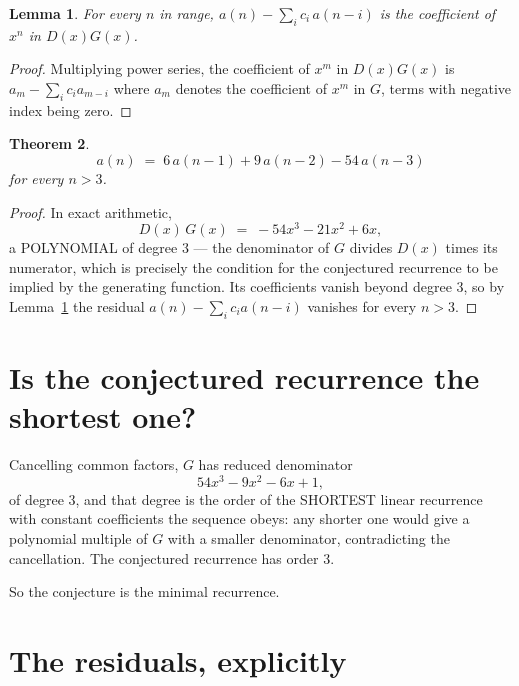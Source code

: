 \documentclass[11pt,a4paper]{article}
\theoremstyle{plain}
\newtheorem{theorem}{Theorem}
\newtheorem{lemma}[theorem]{Lemma}
\theoremstyle{definition}
\begin{document}
\begin{lemma}\label{lem:key}
For every $n$ in range, $a(n)-\sum_i c_i\,a(n-i)$ is the coefficient of $x^{n}$ in
$D(x)G(x)$.
\end{lemma}

\begin{proof}
Multiplying power series, the coefficient of $x^{m}$ in $D(x)G(x)$ is
$a_m-\sum_i c_i a_{m-i}$ where $a_m$ denotes the coefficient of $x^{m}$ in $G$, terms with
negative index being zero.
\end{proof}

\begin{theorem}
\[
a(n)\;=\;6\,a(n-1) + 9\,a(n-2) - 54\,a(n-3)
\]
for every $n>3$.
\end{theorem}

\begin{proof}
In exact arithmetic,
\[
D(x)\,G(x)\;=\;- 54 x^{3} - 21 x^{2} + 6 x,
\]
a POLYNOMIAL of degree $3$ --- the denominator of $G$ divides $D(x)$ times its numerator,
which is precisely the condition for the conjectured recurrence to be implied by the
generating function. Its coefficients vanish beyond degree $3$, so by
Lemma~\ref{lem:key} the residual $a(n)-\sum_ic_ia(n-i)$ vanishes for every
$n>3$.
\end{proof}

\section{Is the conjectured recurrence the shortest one?}

Cancelling common factors, $G$ has reduced denominator
\[
54 x^{3} - 9 x^{2} - 6 x + 1,
\]
of degree $3$, and that degree is the order of the SHORTEST linear recurrence with
constant coefficients the sequence obeys: any shorter one would give a polynomial multiple of
$G$ with a smaller denominator, contradicting the cancellation. The conjectured recurrence has
order $3$.

So the conjecture is the minimal recurrence.

\section{The residuals, explicitly}
\end{document}
